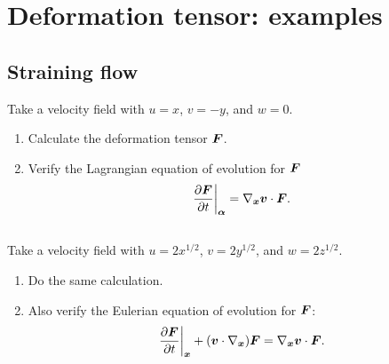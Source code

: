 \documentclass[11pt,letterpaper]{article}
\begin{document}
\section{Deformation tensor: examples}

\subsection{Straining flow}
Take a velocity field with $u=x$, $v=-y$, and $w=0$. 
\begin{enumerate}
    \item Calculate the deformation tensor $\boldsymbol{F}$.
    \item Verify the Lagrangian equation of evolution for $\boldsymbol{F}$
        \begin{align}
            \left.\frac{\partial\boldsymbol{F}}{\partial t}\right|_{\boldsymbol{\alpha}} = \nabla_{\boldsymbol{x}}\boldsymbol{v}\cdot \boldsymbol{F}.
        \end{align}
\end{enumerate}

\subsection{}
Take a velocity field with $u=2x^{1/2}$, $v=2y^{1/2}$, and $w=2z^{1/2}$. 
\begin{enumerate}
    \item Do the same calculation.
    \item Also verify the Eulerian equation of evolution for $\boldsymbol{F}$:
        \begin{align}
            \left.\frac{\partial\boldsymbol{F}}{\partial t}\right|_{\boldsymbol{x}}+(\boldsymbol{v}\cdot\nabla_{\boldsymbol{x}})\boldsymbol{F} = \nabla_{\boldsymbol{x}}\boldsymbol{v}\cdot \boldsymbol{F}.\label{eq:F_eq_euler}
        \end{align}
\end{enumerate}
\end{document}
